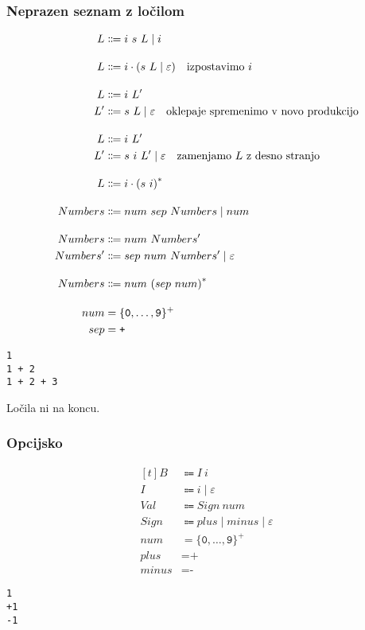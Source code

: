 \documentclass{report}
\newcommand{\Null}{\varepsilon}
\newcommand{\Char}[1]{\texttt{#1}}
\newcommand{\Seq}{\cdot}
\newcommand{\Spc}{\ }
\newcommand{\Union}{\mathrel{|}}
\newcommand{\Kleene}[1]{{#1}^\ast}
\newcommand{\KleenePlus}[1]{#1^+}
\newcommand{\Arrow}{\Coloneq}
\newcommand{\NT}[1]{{#1}}
\newcommand{\T}[1]{{#1}}
\begin{document}
\subsubsection{Neprazen seznam z ločilom}
\begin{equation*}
  \begin{aligned}[t]
    \NT{L} &\Arrow \T{i} \Spc \T{s} \Spc \NT{L} \Union \T{i}\\[1em]
    \NT{L} &\Arrow \T{i} \Seq (\T{s} \Spc \NT{L} \Union \Null)\text{\quad izpostavimo $\T{i}$}\\[1em]
    \NT{L} &\Arrow \T{i} \Spc \NT{L'}\\
    \NT{L'} &\Arrow \T{s} \Spc \NT{L} \Union \Null \text{\quad oklepaje spremenimo v novo produkcijo}\\[1em]
    \NT{L} &\Arrow \T{i} \Spc \NT{L'}\\
    \NT{L'} &\Arrow \T{s} \Spc \T{i} \Spc \NT{L'} \Union \Null \text{\quad zamenjamo $\NT{L}$ z desno stranjo}\\[1em]
    \NT{L} &\Arrow \T{i} \Seq \Kleene{(\T{s} \Spc \T{i})}\\[1em]
    \NT{Numbers} &\Arrow \T{num} \Spc \T{sep} \Spc \NT{Numbers} \Union \T{num}\\[1em]
    \NT{Numbers} &\Arrow \T{num} \Spc \NT{Numbers'}\\
    \NT{Numbers'} &\Arrow \T{sep} \Spc \T{num} \Spc \NT{Numbers'} \Union \Null\\[1em]
    \NT{Numbers} &\Arrow \T{num} \Spc \Kleene{(\T{sep} \Spc \T{num})}\\[1em]
    \T{num} &= \KleenePlus{\{\Char{0}, \dots, \Char{9}\}}\\
    \T{sep} &= \Char{+}
  \end{aligned}
\end{equation*}
\begin{lstlisting}
1
1 + 2
1 + 2 + 3
\end{lstlisting}
Ločila ni na koncu.

\subsubsection{Opcijsko}
\begin{equation*}
  \begin{aligned}[t]
    \NT{B} &\Arrow \NT{I} \Spc \T{i}\\
    \NT{I} &\Arrow \T{i} \Union \Null \\[1em]
    \NT{Val} &\Arrow \NT{Sign} \Spc \T{num}\\
    \NT{Sign} &\Arrow \T{plus} \Union \T{minus} \Union \Null\\[1em]
    \T{num} &= \KleenePlus{\{\Char{0}, \dots, \Char{9}\}}\\
    \T{plus} &= \Char{+}\\
    \T{minus} &= \Char{-}
  \end{aligned}
\end{equation*}
\begin{lstlisting}
1
+1
-1
\end{lstlisting}
\end{document}
